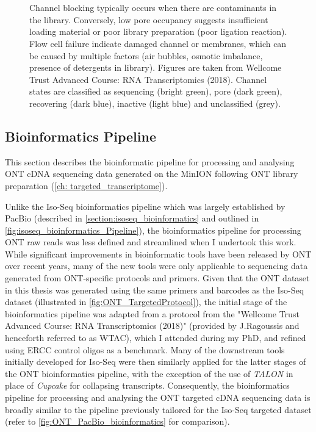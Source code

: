 \begin{figure}[]
{	\\ \\
	Channel blocking typically occurs when there are contaminants in the library. Conversely, low pore occupancy suggests insufficient loading material or poor library preparation (poor ligation reaction). Flow cell failure indicate damaged channel or membranes, which can be caused by multiple factors (air bubbles, osmotic imbalance, presence of detergents in library). Figures are taken from Wellcome Trust Advanced Course: RNA Transcriptomics (2018). Channel states are classified as sequencing (bright green), pore (dark green), recovering (dark blue), inactive (light blue) and unclassified (grey).}
	\label{fig:ONTPoreOccupancy}
\end{figure}

\clearpage
\subsection{Bioinformatics Pipeline}
\label{section:ont_bioinformatics}
This section describes the bioinformatic pipeline for processing and analysing ONT cDNA sequencing data generated on the MinION following ONT library preparation (\cref{ch: targeted_transcriptome}). 

Unlike the Iso-Seq bioinformatics pipeline which was largely established by PacBio (described in \cref{section:isoseq_bioinformatics} and outlined in \cref{fig:isoseq_bioinformatics_Pipeline}), the bioinformatics pipeline for processing ONT raw reads was less defined and streamlined when I undertook this work. While significant improvements in bioinformatic tools have been released by ONT over recent years, many of the new tools were only applicable to sequencing data generated from ONT-specific protocols and primers. Given that the ONT dataset in this thesis was generated using the same primers and barcodes as the Iso-Seq dataset (illustrated in \cref{fig:ONT_TargetedProtocol}), the initial stage of the bioinformatics pipeline was adapted from a protocol from the "Wellcome Trust Advanced Course: RNA Transcriptomics (2018)" (provided by J.Ragoussis and henceforth referred to as WTAC), which I attended during my PhD, and refined using ERCC control oligos as a benchmark. Many of the downstream tools initially developed for Iso-Seq were then similarly applied for the latter stages of the ONT bioinformatics pipeline, with the exception of the use of \textit{TALON} in place of \textit{Cupcake} for collapsing transcripts. Consequently, the bioinformatics pipeline for processing and analysing the ONT targeted cDNA sequencing data is broadly similar to the pipeline previously tailored for the Iso-Seq targeted dataset (refer to \cref{fig:ONT_PacBio_bioinformatics} for comparison). 

